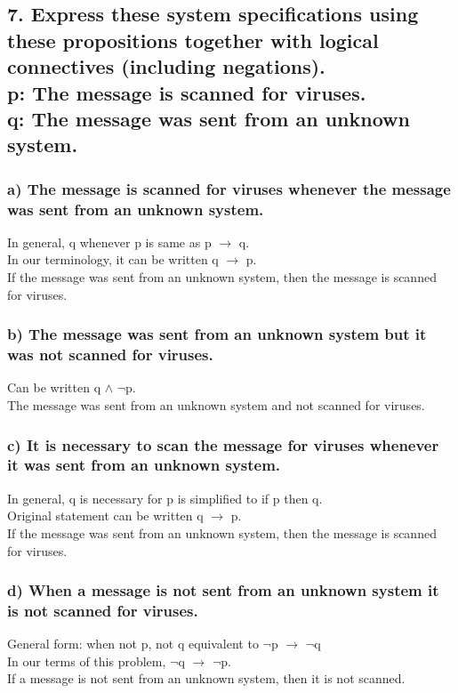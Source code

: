 \documentclass[11pt, oneside]{article} %
\numberwithin{equation}{section} %
\numberwithin{figure}{section} %
\numberwithin{table}{section} %
\begin{document}
\subsection{7. Express these system specifications using these propositions together with logical connectives (including negations). \\
p: The message is scanned for viruses. \\
q: The message was sent from an unknown system.}
\subsubsection{a) The message is scanned for viruses whenever the message was sent from an unknown system.}
In general, q whenever p is same as p $\rightarrow$ q.\\
In our terminology, it can be written q $\rightarrow$ p. \\
If the message was sent from an unknown system, then the message is scanned for viruses.
\subsubsection{b) The message was sent from an unknown system but it was not scanned for viruses.}
Can be written q $\wedge$ $\neg$p. \\
The message was sent from an unknown system and not scanned for viruses.
\subsubsection{c) It is necessary to scan the message for viruses whenever it was sent from an unknown system.}
In general, q is necessary for p is simplified to if p then q. \\
Original statement can be written q $\rightarrow$ p. \\
If the message was sent from an unknown system, then the message is scanned for viruses.
\subsubsection{d) When a message is not sent from an unknown system it is not scanned for viruses.}
General form: when not p, not q equivalent to $\neg$p $\rightarrow$ $\neg$q \\
In our terms of this problem, $\neg$q $\rightarrow$ $\neg$p.\\
If a message is not sent from an unknown system, then it is not scanned.\\
\end{document}

